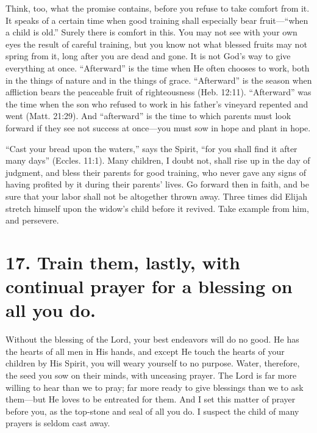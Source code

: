 \documentclass[
]{book}
\begin{document}
Think, too, what the promise contains, before you refuse to take comfort from it. It speaks of a certain time when good training shall especially bear fruit---``when a child is old.'' Surely there is comfort in this. You may not see with your own eyes the result of careful training, but you know not what blessed fruits may not spring from it, long after you are dead and gone. It is not God's way to give everything at once. ``Afterward'' is the time when He often chooses to work, both in the things of nature and in the things of grace. ``Afterward'' is the season when affliction bears the peaceable fruit of righteousness (Heb. 12:11). ``Afterward'' was the time when the son who refused to work in his father's vineyard repented and went (Matt. 21:29). And ``afterward'' is the time to which parents must look forward if they see not success at once---you must sow in hope and plant in hope.

``Cast your bread upon the waters,'' says the Spirit, ``for you shall find it after many days'' (Eccles. 11:1). Many children, I doubt not, shall rise up in the day of judgment, and bless their parents for good training, who never gave any signs of having profited by it during their parents' lives. Go forward then in faith, and be sure that your labor shall not be altogether thrown away. Three times did Elijah stretch himself upon the widow's child before it revived. Take example from him, and persevere.

\hypertarget{train-them-lastly-with-continual-prayer-for-a-blessing-on-all-you-do.}{%
\section*{17. Train them, lastly, with continual prayer for a blessing on all you do.}\label{train-them-lastly-with-continual-prayer-for-a-blessing-on-all-you-do.}}

Without the blessing of the Lord, your best endeavors will do no good. He has the hearts of all men in His hands, and except He touch the hearts of your children by His Spirit, you will weary yourself to no purpose. Water, therefore, the seed you sow on their minds, with unceasing prayer. The Lord is far more willing to hear than we to pray; far more ready to give blessings than we to ask them---but He loves to be entreated for them. And I set this matter of prayer before you, as the top-stone and seal of all you do. I suspect the child of many prayers is seldom cast away.
\end{document}
